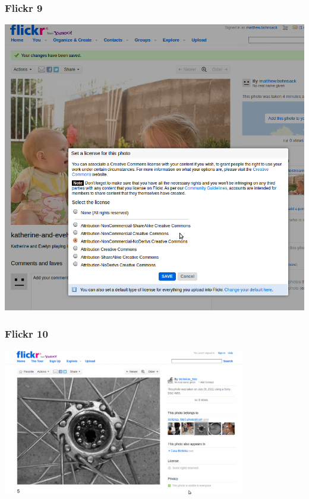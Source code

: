 \documentclass[mathserif,xcolor=dvipsnames,hyperref={bookmarks=true}]{beamer}
\begin{document}
    \begin{frame}[t]
        \frametitle{Flickr 9}
        \begin{center}
            \includegraphics[height=0.8\textheight]{set-you-license-on-flickr.png}
        \end{center}
    \end{frame}
    \begin{frame}[t]
        \frametitle{Flickr 10}
        \begin{center}
            \includegraphics[width=0.8\textwidth]{view-cc-licensed-photo-on-flickr.png}
        \end{center}
    \end{frame}
\end{document}
